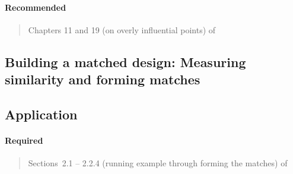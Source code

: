 \documentclass[12pt]{article}
\begin{document}
\begin{verse}  \end{verse}

\paragraph*{Recommended}

\begin{verse}  \end{verse}

\begin{verse}  \end{verse}

\begin{verse}  \end{verse}

\begin{verse}  \end{verse}

\begin{verse} Chapters 11 and 19 (on overly influential points) of  \end{verse}

\subsection{Building a matched design: Measuring similarity and forming matches}

\subsection*{Application}

\begin{verse}  \end{verse}

\begin{verse}  \end{verse}

\paragraph*{Required}

\begin{verse} Sections~2.1 -- 2.2.4 (running example through forming the matches) of  \end{verse}
\end{document}
